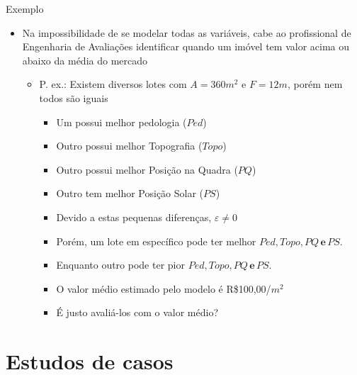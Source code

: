 \documentclass[9pt,ignorenonframetext,aspectratio=169]{beamer}
\providecommand{\tightlist}{%
  \setlength{\itemsep}{0pt}\setlength{\parskip}{0pt}}
\begin{document}
\begin{frame}{Exemplo}
\protect\hypertarget{exemplo}{}

\begin{itemize}[<+->]
\tightlist
\item
  Na impossibilidade de se modelar todas as variáveis, cabe ao
  profissional de Engenharia de Avaliações identificar quando um imóvel
  tem valor acima ou abaixo da média do mercado

  \begin{itemize}[<+->]
  \tightlist
  \item
    P. ex.: Existem diversos lotes com \(A = 360m^2\) e \(F = 12m\),
    porém nem todos são iguais

    \begin{itemize}[<+->]
    \tightlist
    \item
      Um possui melhor pedologia (\(Ped\))
    \item
      Outro possui melhor Topografia (\(Topo\))
    \item
      Outro possui melhor Posição na Quadra (\(PQ\))
    \item
      Outro tem melhor Posição Solar (\(PS\))
    \item
      Devido a estas pequenas diferenças, \(\varepsilon \ne 0\)
    \item
      Porém, um lote em específico pode ter melhor
      \(Ped, Topo, PQ \,\textbf{e}\, PS\).
    \item
      Enquanto outro pode ter pior \(Ped, Topo, PQ \,\textbf{e}\, PS\).
    \item
      O valor médio estimado pelo modelo é R\$100,00/\(m^2\)
    \item
      É justo avaliá-los com o valor médio?
    \end{itemize}
  \end{itemize}
\end{itemize}

\end{frame}

\hypertarget{estudos-de-casos}{%
\section{Estudos de casos}\label{estudos-de-casos}}
\end{document}
